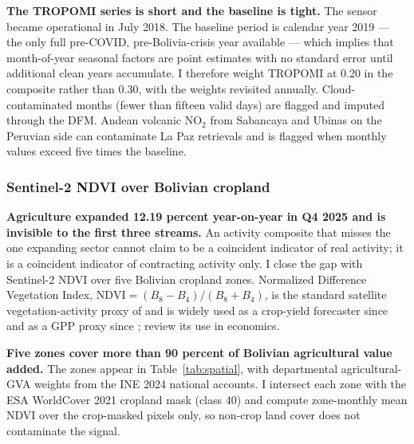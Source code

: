 \documentclass[11pt,letterpaper]{article}
\newcommand{\claim}[1]{\textbf{#1.}}
\begin{document}
\claim{The TROPOMI series is short and the baseline is tight} The sensor became operational in July \num{2018}. The baseline period is calendar year \num{2019} --- the only full pre-COVID, pre-Bolivia-crisis year available --- which implies that month-of-year seasonal factors are point estimates with no standard error until additional clean years accumulate. I therefore weight TROPOMI at \num{0.20} in the composite rather than \num{0.30}, with the weights revisited annually. Cloud-contaminated months (fewer than fifteen valid days) are flagged and imputed through the DFM. Andean volcanic NO$_2$ from Sabancaya and Ubinas on the Peruvian side can contaminate La Paz retrievals and is flagged when monthly values exceed five times the baseline.

\subsubsection{Sentinel-2 NDVI over Bolivian cropland}

\claim{Agriculture expanded \num{12.19} percent year-on-year in Q4 \num{2025} and is invisible to the first three streams} An activity composite that misses the one expanding sector cannot claim to be a coincident indicator of real activity; it is a coincident indicator of contracting activity only. I close the gap with Sentinel-2 NDVI over five Bolivian cropland zones. Normalized Difference Vegetation Index, $\mathrm{NDVI} = (B_8 - B_4) / (B_8 + B_4)$, is the standard satellite vegetation-activity proxy of \citet{gao1996} and is widely used as a crop-yield forecaster since \citet{johnson_etal2014} and as a GPP proxy since \citet{donohue_etal2008}; \citet{donaldson_storeygard2016} review its use in economics.

\claim{Five zones cover more than \num{90} percent of Bolivian agricultural value added} The zones appear in Table~\ref{tab:spatial}, with departmental agricultural-GVA weights from the INE \num{2024} national accounts. I intersect each zone with the ESA WorldCover \num{2021} cropland mask (class \num{40}) and compute zone-monthly mean NDVI over the crop-masked pixels only, so non-crop land cover does not contaminate the signal.
\end{document}
